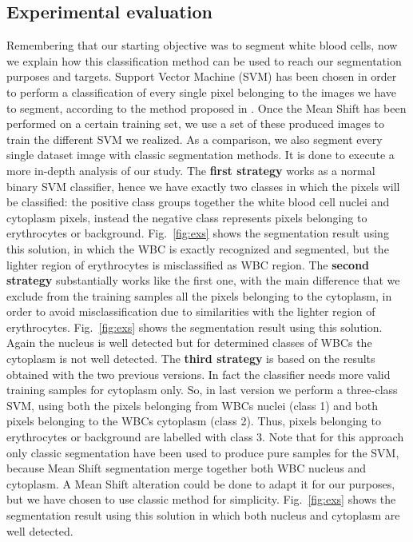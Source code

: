 \documentclass[final,a4paper,12pt,english]{UnicaPhdThesis3}
\begin{document}
\subsection{Experimental evaluation}
Remembering that our starting objective was to segment white blood cells, now we explain how this classification method can be used to reach our segmentation purposes and targets. Support Vector Machine (SVM) has been chosen in order to perform a classification of every single pixel belonging to the images we have to segment, according to the method proposed in \cite{Pan}. Once the Mean Shift has been performed on a certain training set, we use a set of these produced images to train the different SVM we realized. As a comparison, we also segment every single dataset image with classic segmentation methods. It is done to execute a more in-depth analysis of our study. The \textbf{first strategy} works as a normal binary SVM classifier, hence we have exactly two classes in which the pixels will be classified: the positive class groups together the white blood cell nuclei and cytoplasm pixels, instead the negative class represents pixels belonging to erythrocytes or background. Fig.~\ref{fig:exs} shows the segmentation result using this solution, in which the WBC is exactly recognized and segmented, but the lighter region of erythrocytes is misclassified as WBC region. The \textbf{second strategy} substantially works like the first one, with the main difference that we exclude from the training samples all the pixels belonging to the cytoplasm, in order to avoid misclassification due to similarities with the lighter region of erythrocytes. Fig.~\ref{fig:exs} shows the segmentation result using this solution. Again the nucleus is well detected but for determined classes of WBCs the cytoplasm is not well detected. The \textbf{third strategy} is based on the results obtained with the two previous versions. In fact the classifier needs more valid training samples for cytoplasm only. So, in last version we perform a three-class SVM, using both the pixels belonging from WBCs nuclei (class 1) and both pixels belonging to the WBCs cytoplasm (class 2). Thus, pixels belonging to erythrocytes or background are labelled with class 3. Note that for this approach only classic segmentation have been used to produce pure samples for the SVM, because Mean Shift segmentation merge together both WBC nucleus and cytoplasm. A Mean Shift alteration could be done to adapt it for our purposes, but we have chosen to use classic method for simplicity. Fig.~\ref{fig:exs} shows the segmentation result using this solution in which both nucleus and cytoplasm are well detected.
\end{document}

